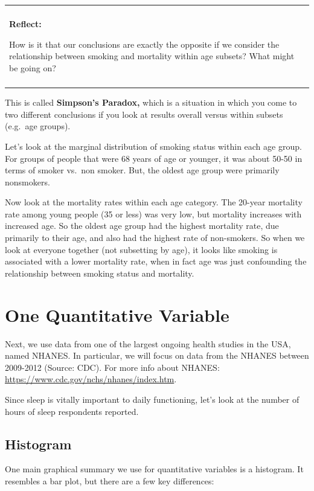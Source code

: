 \documentclass[
]{book}
\newenvironment{reflect}
{
    \begin{center}
    
    \begin{tabular}{|p{0.8\textwidth}|}
    \rowcolor{LightBlue}
    \hline\\
    \rowcolor{LightBlue}
    \textbf{Reflect:}
}
{
    \\\rowcolor{LightBlue}
    \\\hline
    \end{tabular} 
    \end{center}
}
\begin{document}
\begin{reflect}
How is it that our conclusions are exactly the opposite if we consider
the relationship between smoking and mortality within age subsets? What
might be going on?
\end{reflect}

This is called \textbf{Simpson's Paradox,} which is a situation in which you come to two different conclusions if you look at results overall versus within subsets (e.g.~age groups).

Let's look at the marginal distribution of smoking status within each age group. For groups of people that were 68 years of age or younger, it was about 50-50 in terms of smoker vs.~non smoker. But, the oldest age group were primarily nonsmokers.

Now look at the mortality rates within each age category. The 20-year mortality rate among young people (35 or less) was very low, but mortality increases with increased age. So the oldest age group had the highest mortality rate, due primarily to their age, and also had the highest rate of non-smokers. So when we look at everyone together (not subsetting by age), it looks like smoking is associated with a lower mortality rate, when in fact age was just confounding the relationship between smoking status and mortality.

\hypertarget{one-quantitative-variable}{%
\section{One Quantitative Variable}\label{one-quantitative-variable}}

Next, we use data from one of the largest ongoing health studies in the USA, named NHANES. In particular, we will focus on data from the NHANES between 2009-2012 (Source: CDC). For more info about NHANES: \url{https://www.cdc.gov/nchs/nhanes/index.htm}.

Since sleep is vitally important to daily functioning, let's look at the number of hours of sleep respondents reported.

\hypertarget{histogram}{%
\subsection{Histogram}\label{histogram}}

One main graphical summary we use for quantitative variables is a histogram. It resembles a bar plot, but there are a few key differences:
\end{document}
